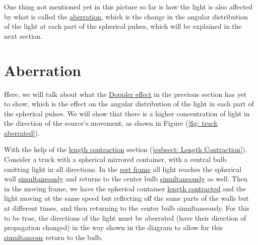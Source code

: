 One thing not mentioned yet in this picture so far is how the light is also affected by what is called the \hyperlink{def-aberration}{aberration}, which is the change in the angular distribution of the light at each part of the spherical pulses, which will be explained in the next section.

\section{Aberration} \label{sect: Aberration}

Here, we will talk about what the \hyperlink{def-doppler-effect}{Doppler effect} in the previous section has yet to show, which is the effect on the angular distribution of the light in each part of the spherical pulses.
We will show that there is a higher concentration of light in the direction of the source's movement, as shown in Figure (\ref{fig: truck aberrated}).

With the help of the \hyperlink{def-length-contraction}{length contraction} section (\ref{subsect: Length Contraction}), Consider a truck with a spherical mirrored container, with a central bulb emitting light in all directions.
In the \hyperlink{def-proper-frame}{rest frame} all light reaches the spherical wall \hyperlink{def-simultaneity}{simultaneously} and returns to the center bulb \hyperlink{def-simultaneity}{simultaneously} as well.
Then in the moving frame, we have the spherical container \hyperlink{def-length-contraction}{length contracted} and the light moving at the same speed but reflecting off the same parts of the walls but at different times, and then returning to the center bulb simultaneously.
For this to be true, the directions of the light must be aberrated (have their direction of propagation changed) in the way shown in the diagram to allow for this \hyperlink{def-simultaneity}{simultaneous} return to the bulb.


